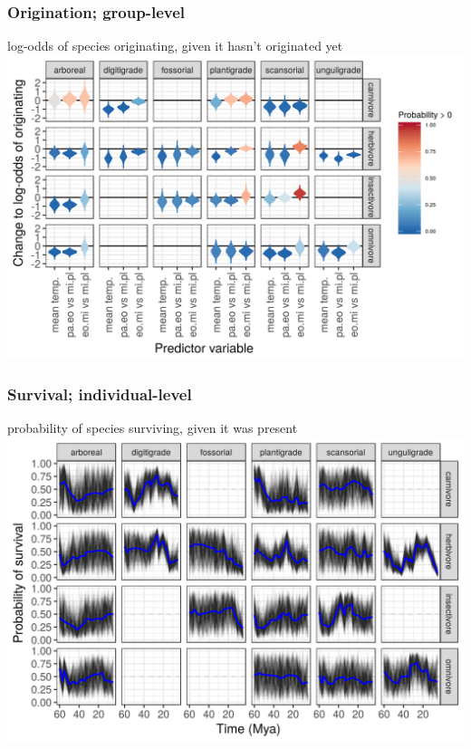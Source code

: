 \documentclass{beamer}
\begin{document}
\begin{frame}
  \frametitle{Origination; group-level}
  \begin{center}
    log-odds of species originating, given it hasn't originated yet
    \includegraphics[height=0.8\textheight,width=\textwidth,keepaspectratio=true]{figure/group_on_origin_bd}
  \end{center}
\end{frame}

\begin{frame}
  \frametitle{Survival; individual-level}
  \begin{center}
    probability of species surviving, given it was present
    \includegraphics[height=0.8\textheight,width=\textwidth,keepaspectratio=true]{figure/ecotype_survival_bd}
  \end{center}
\end{frame}
\end{document}
